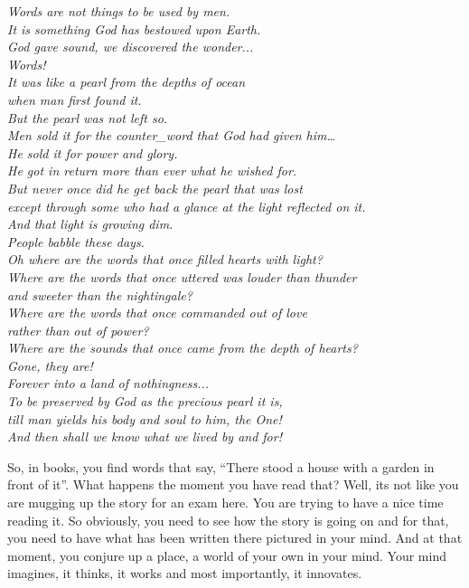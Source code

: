 \documentclass[twoside,11pt]{article}
\begin{document}
\emph{Words are not things to be used by men.\\It is something God has bestowed upon Earth.\\God gave sound, we discovered the wonder...\\Words!\\It was like a pearl from the depths of ocean\\when man first found it.\\But the pearl was not left so.\\Men sold it for the counter\_word that God had given him…\\He sold it for power and glory.\\He got in return more than ever what he wished for.\\But never once did he get back the pearl that was lost\\except through some who had a glance at the light reflected on it.\\And that light is growing dim.\\People babble these days.\\Oh where are the words that once filled hearts with light?\\Where are the words that once uttered was louder than thunder\\and sweeter than the nightingale?\\Where are the words that once commanded out of love\\rather than out of power?\\Where are the sounds that once came from the depth of hearts?\\Gone, they are!\\Forever into a land of nothingness...\\To be preserved by God as the precious pearl it is,\\till man yields his body and soul to him, the One!\\And then shall we know what we lived by and for!}

So, in books, you find words that say, ``There stood a house with a garden in front of it''. What happens the moment you have read that? Well, its not like you are mugging up the story for an exam here. You are trying to have a nice time reading it. So obviously, you need to see how the story is going on and for that, you need to have what has been written there pictured in your mind. And at that moment, you conjure up a place, a world of your own in your mind. Your mind imagines, it thinks, it works and most importantly, it innovates.
\end{document}
